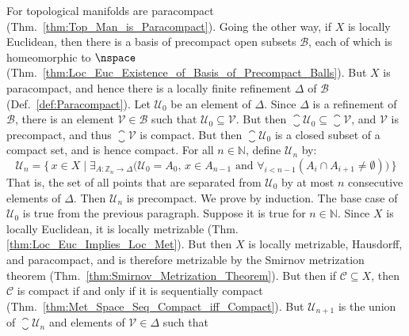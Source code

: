 \documentclass{article}                                                        %
\begin{document}
        \begin{solution}
            For topological manifolds are paracompact
            (Thm.~\ref{thm:Top_Man_is_Paracompact}). Going the other way, if $X$
            is locally Euclidean, then there is a basis of precompact open
            subsets $\mathcal{B}$, each of which is homeomorphic to $\nspace$
            (Thm.~\ref{thm:Loc_Euc_Existence_of_Basis_of_Precompact_Balls}). But
            $X$ is paracompact, and hence there is a locally finite refinement
            $\Delta$ of $\mathcal{B}$ (Def.~\ref{def:Paracompact}). Let
            $\mathcal{U}_{0}$ be an element of $\Delta$. Since $\Delta$ is a
            refinement of $\mathcal{B}$, there is an element
            $\mathcal{V}\in\mathcal{B}$ such that
            $\mathcal{U}_{0}\subseteq\mathcal{V}$. But then
            $\closure{\mathcal{U}_{0}}\subseteq\closure{\mathcal{V}}$, and
            $\mathcal{V}$ is precompact, and thus $\closure{\mathcal{V}}$
            is compact. But then $\closure{\mathcal{U}_{0}}$ is a closed subset
            of a compact set, and is hence compact. For all $n\in\mathbb{N}$,
            define $\mathcal{U}_{n}$ by:
            \begin{equation}
                \mathcal{U}_{n}=\Big\{\,x\in{X}\;|\;
                    \exists_{A:\mathbb{Z}_{n}\rightarrow\Delta}\big(
                        \mathcal{U}_{0}=A_{0},\,x\in{A}_{n-1}\textrm{ and }
                        \forall_{i<n-1}(A_{i}\cap{A}_{i+1}\ne\emptyset)
                    \big)\,\Big\}
            \end{equation}
            That is, the set of all points that are separated from
            $\mathcal{U}_{0}$ by at most $n$ consecutive elements of $\Delta$.
            Then $\mathcal{U}_{n}$ is precompact. We prove by induction. The
            base case of $\mathcal{U}_{0}$ is true from the previous paragraph.
            Suppose it is true for $n\in\mathbb{N}$. Since $X$ is locally
            Euclidean, it is locally metrizable
            (Thm.\ref{thm:Loc_Euc_Implies_Loc_Met}). But then $X$ is locally
            metrizable, Hausdorff, and paracompact, and is therefore metrizable
            by the Smirnov metrization theorem
            (Thm.~\ref{thm:Smirnov_Metrization_Theorem}). But then if
            $\mathcal{C}\subseteq{X}$, then $\mathcal{C}$ is compact if and only
            if it is sequentially compact
            (Thm.~\ref{thm:Met_Space_Seq_Compact_iff_Compact}). But
            $\mathcal{U}_{n+1}$ is the union of $\closure{\mathcal{U}_{n}}$ and
            elements of $\mathcal{V}\in\Delta$ such that

\end{solution}
\end{document}
